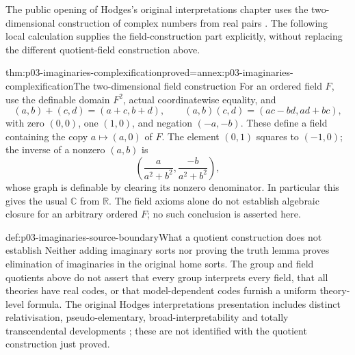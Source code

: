The public opening of Hodges's original interpretations chapter uses the
two-dimensional construction of complex numbers from real pairs
\cite[Chapter~5, public opening summary]{Hodges1993}. The following local
calculation supplies the field-construction part explicitly, without replacing
the different quotient-field construction above.

\begin{hbtheorem}{thm:p03-imaginaries-complexification}{proved=annex:p03-imaginaries-complexification}{The two-dimensional field construction}
For an ordered field \(F\), use the definable domain \(F^2\), actual
coordinatewise equality, and
\[
 (a,b)+(c,d)=(a+c,b+d),\qquad
 (a,b)(c,d)=(ac-bd,ad+bc),
\]
with zero \((0,0)\), one \((1,0)\), and negation \((-a,-b)\).
These define a field containing the copy \(a\mapsto(a,0)\) of \(F\).
The element \((0,1)\) squares to \((-1,0)\); the inverse of a nonzero
\((a,b)\) is
\[
       \left(\frac{a}{a^2+b^2},\frac{-b}{a^2+b^2}\right),
\]
whose graph is definable by clearing its nonzero denominator. In particular
this gives the usual \(\mathbb C\) from \(\mathbb R\).
The field axioms alone do not establish algebraic closure for an arbitrary
ordered \(F\); no such conclusion is asserted here.
\end{hbtheorem}

\begin{proofboundary}{def:p03-imaginaries-source-boundary}{What a quotient construction does not establish}
Neither adding imaginary sorts nor proving the truth lemma proves elimination
of imaginaries in the original home sorts. The group and field quotients above
do not assert that every group interprets every field, that all theories have
real codes, or that model-dependent codes furnish a uniform theory-level
formula. The original Hodges interpretations presentation includes distinct
relativisation, pseudo-elementary, broad-interpretability and totally
transcendental developments \cite[Chapter~5 contents]{Hodges1993}; these are
not identified with the quotient construction just proved.
\end{proofboundary}
